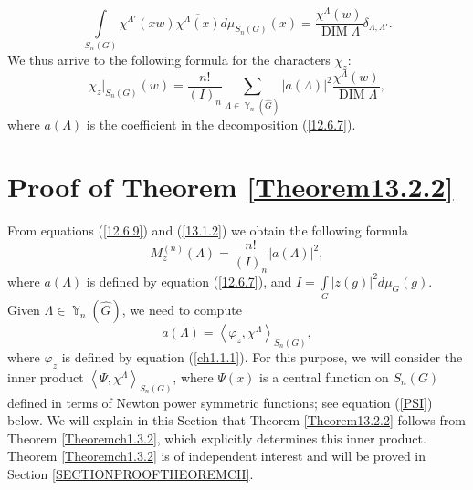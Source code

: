 \documentclass[12pt]{amsart}
\theoremstyle{definition}
\numberwithin{equation}{section}
\DeclareMathOperator{\Y}{\mathbb{Y}}
\DeclareMathOperator{\DIM}{DIM}
\begin{document}
\begin{equation}\label{12.6.8}
\int\limits_{S_n(G)}\chi^{\Lambda'}(xw)\overline{\chi^{\Lambda}(x)}d\mu_{S_n(G)}(x)
=\frac{\chi^{\Lambda}(w)}{\DIM\Lambda}\delta_{\Lambda,\Lambda'}.
\end{equation}
We thus arrive to the following formula for the characters $\chi_z$:
\begin{equation}\label{12.6.9}
\chi_z\vert_{S_n(G)}(w)=\frac{n!}{(I)_n}
\sum\limits_{\Lambda\in\Y_n\left(\widehat{G}\right)}
|a\left(\Lambda\right)|^2\frac{\chi^{\Lambda}(w)}{\DIM\Lambda},
\end{equation}
where $a\left(\Lambda\right)$ is the coefficient in the decomposition (\ref{12.6.7}).
\section{Proof of Theorem \ref{Theorem13.2.2}}\label{SECTIONPROOFT1}
From equations   (\ref{12.6.9}) and (\ref{13.1.2}) we obtain the following formula
\begin{equation}\label{13.2.1}
M_z^{(n)}\left(\Lambda\right)=\frac{n!}{\left(I\right)_n}|a(\Lambda)|^2,
\end{equation}
where $a(\Lambda)$ is defined by equation (\ref{12.6.7}), and $I=\int\limits_G|z(g)|^2d\mu_G(g)$.
Given $\Lambda\in\Y_n\left(\widehat{G}\right)$, we need to compute
\begin{equation}\label{ch1.1.2}
a(\Lambda)=\left<\varphi_z,\chi^{\Lambda}\right>_{S_n(G)},
\end{equation}
where $\varphi_z$ is defined by equation (\ref{ch1.1.1}). For this purpose, we will consider the inner product
$\left<\Psi,\chi^{\Lambda}\right>_{S_n(G)}$, where $\Psi(x)$
is a central function on $S_n(G)$ defined in terms of Newton
power symmetric functions; see equation (\ref{PSI}) below.
 We will explain in this Section that Theorem \ref{Theorem13.2.2} follows from Theorem \ref{Theoremch1.3.2}, which explicitly determines this inner product.  Theorem \ref{Theoremch1.3.2} is of independent interest and will be proved in Section \ref{SECTIONPROOFTHEOREMCH}.
\end{document}
